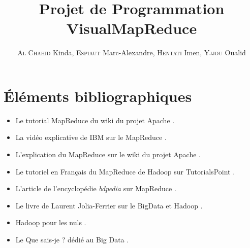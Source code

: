 \documentclass[a4paper,12pt]{article}
\title{Projet de Programmation\\VisualMapReduce\\}
\author{\textsc{Al Chahid} Kinda, \textsc{Espiaut} Marc-Alexandre, \textsc{Hentati} Imen, \textsc{Yjjou} Oualid}
\begin{document}
	\maketitle
	\section{Éléments bibliographiques}
	
	\begin{itemize}
	\item Le tutorial MapReduce du wiki du projet Apache \cite{ApacheWikiMRTut}.
	\item La vidéo explicative de IBM sur le MapReduce \cite{IBMMRVideo}.
	\item L'explication du MapReduce sur le wiki du projet Apache \cite{ApacheWikiMRInfo}.
	\item Le tutoriel en Français du MapReduce de Hadoop sur TutorialsPoint \cite{TutorialsPointHadoopMR}.
	\item L'article de l'encyclopédie \textit{bdpedia} sur MapReduce \cite{Bdpedia}.
	\item Le livre de Laurent Jolia-Ferrier sur le BigData et Hadoop \cite{JoliaFerrierBigData}.
	\item Hadoop pour les nuls \cite{DummiesHadoop}.
	\item Le Que sais-je ? dédié au Big Data \cite{QuesaisjeBigData}.
	\end{itemize}
	
\end{document}
